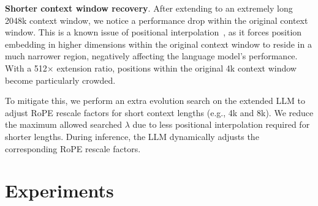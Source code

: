 \begin{table}
	\caption{Perplexity evaluation within 256k context length on PG19.}
	\small
	\label{tbl:pg19}
\end{table}

\textbf{Shorter context window recovery}.  After extending to an extremely long 2048k context window, we notice a performance drop within the original context window. This is a known issue of positional interpolation~\cite{pi}, as it forces position embedding in higher dimensions within the original context window to reside in a much narrower region, negatively affecting the language model's performance. With a 512$\times$ extension ratio, positions within the original 4k context window become particularly crowded.

To mitigate this, we perform an extra evolution search on the extended LLM to adjust RoPE rescale factors for short context lengths (e.g., 4k and 8k). We reduce the maximum allowed searched $\lambda$ due to less positional interpolation required for shorter lengths. During inference, the LLM dynamically adjusts the corresponding RoPE rescale factors.

 \section{Experiments}

